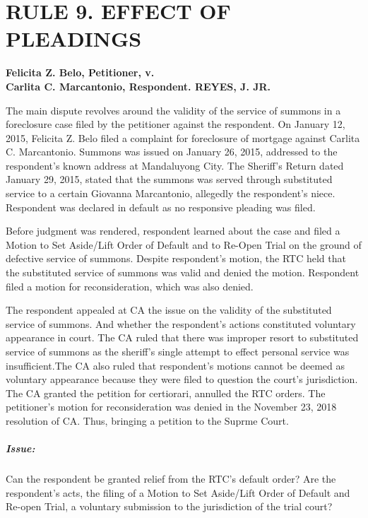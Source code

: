 \documentclass[
12pt,
oneside,
onehalfspacing,
headsepline
]{DigestCollection}
\begin{document}
\chapter{RULE 9. EFFECT OF PLEADINGS}




\noindent\textbf{Felicita Z. Belo, Petitioner, v. \\Carlita C. Marcantonio, Respondent. REYES, J. JR.}

The main dispute revolves around the validity of the service of summons in a foreclosure case filed by the petitioner against the respondent. On January 12, 2015, Felicita Z. Belo filed a complaint for foreclosure of mortgage against Carlita C. Marcantonio. Summons was issued on January 26, 2015, addressed to the respondent's known address at Mandaluyong City. The Sheriff's Return dated January 29, 2015, stated that the summons was served through substituted service to a certain Giovanna Marcantonio, allegedly the respondent's niece. Respondent was declared in default as no responsive pleading was filed.

Before judgment was rendered, respondent learned about the case and filed a Motion to Set Aside/Lift Order of Default and to Re-Open Trial on the ground of defective service of summons. Despite respondent's motion, the RTC held that the substituted service of summons was valid and denied the motion. Respondent filed a motion for reconsideration, which was also denied.

The respondent appealed at CA the issue on the validity of the substituted service of summons. And whether the respondent's actions constituted voluntary appearance in court. The CA ruled that there was improper resort to substituted service of summons as the sheriff's single attempt to effect personal service was insufficient.The CA also ruled that respondent's motions cannot be deemed as voluntary appearance because they were filed to question the court's jurisdiction. The CA granted the petition for certiorari, annulled the RTC orders. The petitioner's motion for reconsideration was denied in the November 23, 2018 resolution of CA. Thus, bringing a petition to the Suprme Court.

\paragraph{Issue:}

Can the respondent be granted relief from the RTC's default order? Are the respondent's acts, the filing of a Motion to Set Aside/Lift Order of Default and Re-open Trial, a voluntary submission to the jurisdiction of the trial court?
\end{document}
